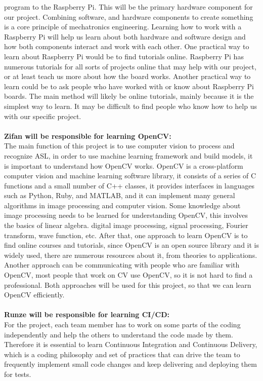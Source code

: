 \documentclass[12pt]{article}
\begin{document}
program to the Raspberry Pi. This will be the primary hardware component for our project. Combining software, and hardware components to
create something is a core principle of mechatronics engineering. Learning how to work with a Raspberry Pi will help us learn about both
hardware and software design and how both components interact and work with each other. One practical way to learn about Raspberry Pi would
be to find tutorials online. Raspberry Pi has numerous tutorials for all sorts of projects online that may help with our project, or at least
teach us more about how the board works. Another practical way to learn could be to ask people who have worked with or know about Raspberry
Pi boards. The main method will likely be online tutorials, mainly because it is the simplest way to learn. It may be difficult to find people
who know how to help us with our specific project.\\
~\\
\textbf{Zifan will be responsible for learning OpenCV:}\\
The main function of this project is to use computer vision to process and recognize ASL, in order to use machine learning framework and build models, it is important to 
understand how OpenCV works. OpenCV is a cross-platform computer vision and machine learning software library, it consists of a series of C functions and a small number of
C++ classes, it provides interfaces in languages such as Python, Ruby, and MATLAB, and it can implement many general algorithms in image processing and computer vision. 
Some knowledge about image processing needs to be learned for understanding OpenCV, this involves the basics of linear algebra. digital image processing, signal processing, 
Fourier transform, wave function, etc. After that, one approach to learn OpenCV is to find online courses and tutorials, since OpenCV is an open source library and it is
widely used, there are numerous resources about it, from theories to applications. Another approach can be communicating with people who are familiar with OpenCV, most 
people that work on CV use OpenCV, so it is not hard to find a professional. Both approaches will be used for this project, so that we can learn OpenCV efficiently.\\
~\\
\textbf{Runze will be responsible for learning CI/CD:}\\
For the project, each team member has to work on some parts of the coding independently and help the others to understand the code made by them. 
Therefore it is essential to learn Continuous Integration and Continuous Delivery, which is a coding philosophy and set of practices that can drive the team to frequently implement small code changes and keep delivering and deploying them for tests. 
\end{document}
